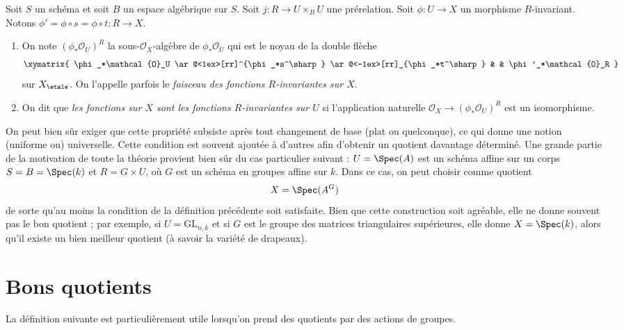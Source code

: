 \begin{definition}
\label{definition-functions}
Soit $S$ un schéma et soit $B$ un espace algébrique sur $S$.
Soit $j : R \to U \times_B U$ une prérelation.
Soit $\phi : U \to X$ un morphisme $R$-invariant.
Notons $\phi' = \phi \circ s = \phi \circ t : R \to X$.
\begin{enumerate}
\item On note $(\phi_*\mathcal{O}_U)^R$ la sous-$\mathcal{O}_X$-algèbre
de $\phi_*\mathcal{O}_U$ qui est le noyau de la double flèche
$$
\xymatrix{
\phi_*\mathcal{O}_U
\ar@<1ex>[rr]^{\phi_*s^\sharp}
\ar@<-1ex>[rr]_{\phi_*t^\sharp}
& &
\phi'_*\mathcal{O}_R
}
$$
sur $X_\etale$. On l'appelle parfois le
{\it faisceau des fonctions $R$-invariantes sur $X$}.
\item On dit que {\it les fonctions sur $X$ sont les fonctions $R$-invariantes sur
$U$} si l'application naturelle $\mathcal{O}_X \to (\phi_*\mathcal{O}_U)^R$
est un isomorphisme.
\end{enumerate}
\end{definition}

\noindent
On peut bien sûr exiger que cette propriété subsiste après tout
changement de base (plat ou quelconque), ce qui donne une notion (uniforme ou) universelle.
Cette condition est souvent ajoutée
à d'autres afin d'obtenir un quotient davantage déterminé. Une grande partie de
la motivation de toute la théorie provient bien sûr du cas particulier suivant :
$U = \Spec(A)$ est un schéma affine sur un corps
$S = B = \Spec(k)$ et $R = G \times U$,
où $G$ est un schéma en groupes affine sur $k$. Dans ce cas,
on peut choisir comme quotient
$$
X = \Spec(A^G)
$$
de sorte qu'au moins la condition de la définition précédente soit satisfaite.
Bien que cette construction soit agréable, elle ne donne souvent pas le bon
quotient ; par exemple, si $U = \text{GL}_{n, k}$ et si $G$ est le groupe des
matrices triangulaires supérieures, elle donne $X = \Spec(k)$, alors qu'il
existe un bien meilleur quotient (à savoir la variété de drapeaux).









\section{Bons quotients}
\label{section-good}

\noindent
La définition suivante est particulièrement utile lorsqu'on prend des quotients
par des actions de groupes.

